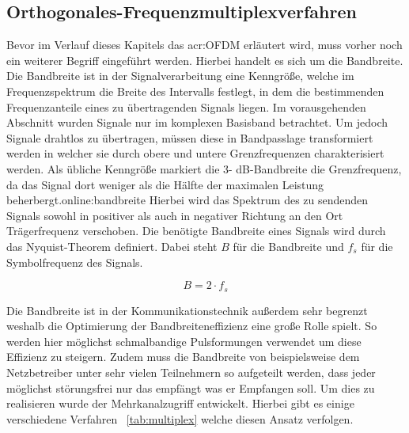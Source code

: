 \subsection{Orthogonales-Frequenzmultiplexverfahren}
\label{subsec:ofdm}
Bevor im Verlauf dieses Kapitels das \gls{acr:OFDM} erläutert wird, muss vorher noch ein weiterer Begriff eingeführt werden. Hierbei handelt es sich um die Bandbreite. Die Bandbreite ist in der Signalverarbeitung eine Kenngröße, welche im Frequenzspektrum die Breite des Intervalls festlegt, in dem die bestimmenden Frequenzanteile eines zu übertragenden Signals liegen. Im vorausgehenden Abschnitt wurden Signale nur im komplexen Basisband betrachtet. Um jedoch Signale drahtlos zu übertragen, müssen diese in Bandpasslage transformiert werden in welcher sie durch obere und untere Grenzfrequenzen charakterisiert werden. Als übliche Kenngröße markiert die 3-
dB-Bandbreite die Grenzfrequenz, da das Signal dort weniger als die
Hälfte der maximalen Leistung beherbergt.\gls{online:bandbreite} Hierbei wird das Spektrum des zu sendenden Signals sowohl in positiver als auch in negativer Richtung an den Ort Trägerfrequenz verschoben. Die benötigte Bandbreite eines Signals wird durch das Nyquist-Theorem definiert. Dabei steht $B$ für die Bandbreite und $f_{s}$ für die Symbolfrequenz des Signals.

\begin{equation}
	\label{equ:bandbreite}
	B = 2 \cdot f_{s}
\end{equation}

Die Bandbreite ist in der Kommunikationstechnik außerdem sehr begrenzt weshalb die Optimierung der Bandbreiteneffizienz eine große Rolle spielt. So werden hier möglichst schmalbandige Pulsformungen verwendet um diese Effizienz zu steigern.\cite{howwireless} Zudem muss die Bandbreite von  beispielsweise dem Netzbetreiber unter sehr vielen Teilnehmern so aufgeteilt werden, dass jeder möglichst störungsfrei nur das empfängt was er Empfangen soll. Um dies zu realisieren wurde der Mehrkanalzugriff entwickelt. Hierbei gibt es einige verschiedene Verfahren ~\ref{tab:multiplex} welche diesen Ansatz verfolgen. 

